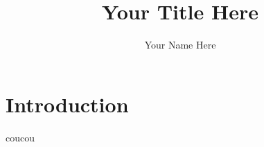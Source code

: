 \documentclass{report}
\author{Your Name Here}
\title{Your Title Here}
\begin{document}
\maketitle
\tableofcontents


\chapter{Introduction}

coucou
\end{document}
